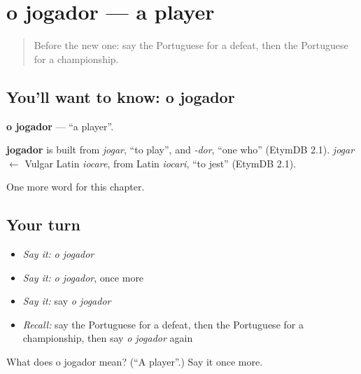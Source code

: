 \section[o jogador]{o jogador — a player}

\label{lesson:PT-C252-jogador}



\begin{quote}
Before the new one: say the Portuguese for a defeat, then the Portuguese for a championship.
\end{quote}

\subsection*{You'll want to know: o jogador}
\textbf{o jogador} — \textquotedblleft{}a player\textquotedblright{}.

\begin{cousinweb}
\textbf{jogador} is built from \emph{jogar}, \textquotedblleft{}to play\textquotedblright{}, and \emph{-dor}, \textquotedblleft{}one who\textquotedblright{} (EtymDB 2.1). \emph{jogar} $\leftarrow$ Vulgar Latin \emph{iocare}, from Latin \emph{iocari}, \textquotedblleft{}to jest\textquotedblright{} (EtymDB 2.1).
\end{cousinweb}

\begin{grammarlens}[title={What you've built}]
One more word for this chapter.
\end{grammarlens}

\subsection*{Your turn}
\begin{itemize}
\raggedright
  \item \emph{Say it:} \emph{o jogador}
  \item \emph{Say it:} \emph{o jogador}, once more
  \item \emph{Say it:} say \emph{o jogador}
  \item \emph{Recall:} say the Portuguese for a defeat, then the Portuguese for a championship, then say \emph{o jogador} again
\end{itemize}

\begin{tcolorbox}[breakable,colback=teal!4,colframe=teal!35!black,title={Before you move on}]
What does o jogador mean? (\textquotedblleft{}A player\textquotedblright{}.) Say it once more.
\end{tcolorbox}
